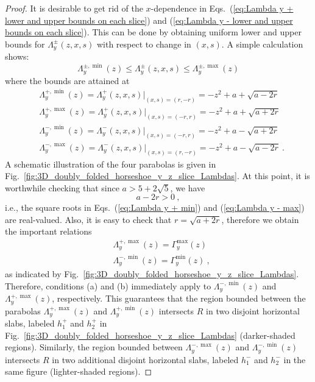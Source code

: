 \documentclass[12pt]{iopart}
\begin{document}
\begin{proof}
It is desirable to get rid of the $x$-dependence in Eqs.~(\ref{eq:Lambda y + lower and upper bounds on each slice}) and (\ref{eq:Lambda y - lower and upper bounds on each slice}). This can be done by obtaining uniform lower and upper bounds for $\Lambda^{\pm}_y(z,x,s)$ with respect to change in $(x,s)$. A simple calculation shows:
\begin{equation}\label{eq:Gamma y +- uniform bounds}
\Lambda^{\pm,\min}_y (z) \leq \Lambda^{\pm}_y(z,x,s) \leq \Lambda^{\pm,\max}_y (z)
\end{equation}
where the bounds are attained at
\begin{eqnarray}
& \Lambda^{+,\min}_y(z) = \Lambda^+_y(z,x,s)|_{(x,s)=(r,-r)} = -z^2 + a + \sqrt{a-2r}  \label{eq:Lambda y + min} \\
& \Lambda^{+,\max}_y(z) = \Lambda^+_y(z,x,s)|_{(x,s)=(-r,r)} = -z^2 + a + \sqrt{a+2r}  \label{eq:Lambda y + max} \\
& \Lambda^{-,\min}_y(z) = \Lambda^-_y(z,x,s)|_{(x,s)=(-r,r)} = -z^2 + a - \sqrt{a+2r}  \label{eq:Lambda y - min} \\
& \Lambda^{-,\max}_y(z) = \Lambda^-_y(z,x,s)|_{(x,s)=(r,-r)} = -z^2 + a - \sqrt{a-2r}  \label{eq:Lambda y - max}\ .
\end{eqnarray}
A schematic illustration of the four parabolas is given in Fig.~\ref{fig:3D_doubly_folded_horseshoe_y_z_slice_Lambdas}. At this point, it is worthwhile checking that since $a > 5 + 2\sqrt{5}$, we have 
\begin{equation}\label{eq:a-2r}
a-2r >0\ ,
\end{equation}
i.e., the square roots in Eqs.~(\ref{eq:Lambda y + min}) and (\ref{eq:Lambda y - max}) are real-valued. Also, it is easy to check that $r = \sqrt{a+2r}$, therefore we obtain the important relations
\begin{eqnarray}\label{eq:Identical parabola bounds}
& \Lambda^{+,\max}_y(z) = \Gamma^{\max}_y(z) \label{eq:Identical parabola bounds max} \\
& \Lambda^{-,\min}_y(z) = \Gamma^{\min}_y(z) \ , \label{eq:Identical parabola bounds min} 
\end{eqnarray}
as indicated by Fig.~\ref{fig:3D_doubly_folded_horseshoe_y_z_slice_Lambdas}. Therefore, conditions (a) and (b) immediately apply to $\Lambda^{-,\min}_y(z)$ and $\Lambda^{+,\max}_y(z)$, respectively. This guarantees that the region bounded between the parabolas \( \Lambda^{+,\max}_y(z) \) and \( \Lambda^{+,\min}_y(z) \) intersects \( R \) in two disjoint horizontal slabs, labeled \( h^+_1 \) and \( h^+_2 \) in Fig.~\ref{fig:3D_doubly_folded_horseshoe_y_z_slice_Lambdas} (darker-shaded regions). Similarly, the region bounded between \( \Lambda^{-,\max}_y(z) \) and \( \Lambda^{-,\min}_y(z) \) intersects \( R \) in two additional disjoint horizontal slabs, labeled \( h^-_1 \) and \( h^-_2 \) in the same figure (lighter-shaded regions).


\end{proof}
\end{document}

